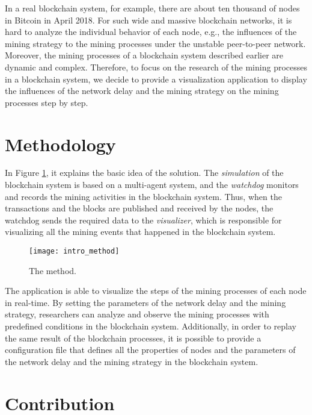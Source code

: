 In a real blockchain system, for example, there are about ten thousand of nodes in Bitcoin in April 2018. For such wide and massive blockchain networks, it is hard to analyze the individual behavior of each node, e.g., the influences of the mining strategy to the mining processes under the unstable peer-to-peer network. Moreover, the mining processes of a blockchain system described earlier are dynamic and complex. Therefore, to focus on the research of the mining processes in a blockchain system, we decide to provide a visualization application to display the influences of the network delay and the mining strategy on the mining processes step by step.

\section{Methodology}

In Figure \ref{fig:the method}, it explains the basic idea of the solution. The \textit{simulation} of the blockchain system is based on a multi-agent system, and the \textit{watchdog} monitors and records the mining activities in the blockchain system. Thus, when the transactions and the blocks are published and received by the nodes, the watchdog sends the required data to the \textit{visualizer}, which is responsible for visualizing all the mining events that happened in the blockchain system. 

\begin{figure}[htb]
    \centering
    \texttt{[image: intro\_method]}
    \caption{The method.}
    \label{fig:the method}
\end{figure}

The application is able to visualize the steps of the mining processes of each node in real-time. By setting the parameters of the network delay and the mining strategy, researchers can analyze and observe the mining processes with predefined conditions in the blockchain system. Additionally, in order to replay the same result of the blockchain processes, it is possible to provide a configuration file that defines all the properties of nodes and the parameters of the network delay and the mining strategy in the blockchain system.

\section{Contribution}

